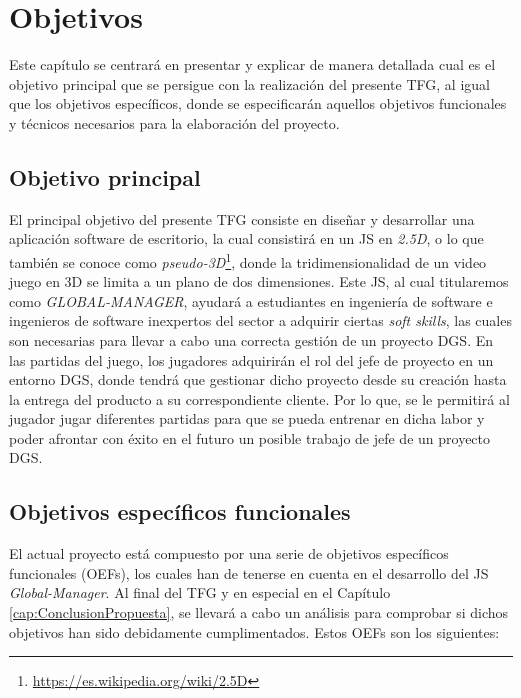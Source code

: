 \chapter{Objetivos}
\label{cap:Objetivo}

Este capítulo se centrará en presentar y explicar de manera detallada cual es el objetivo principal que se persigue con la realización del presente TFG, al igual que los objetivos específicos, donde se especificarán aquellos objetivos funcionales y técnicos necesarios para la elaboración del proyecto.

\section{Objetivo principal}
\label{sec:ObjetivoP}

El principal objetivo del presente TFG consiste en diseñar y desarrollar una aplicación software de escritorio, la cual consistirá en un JS en \emph{2.5D}, o lo que también se conoce como \emph{pseudo-3D}\footnote{\url{https://es.wikipedia.org/wiki/2.5D}}, donde la tridimensionalidad de un video juego en 3D se limita a un plano de dos dimensiones. Este JS, al cual titularemos como \emph{GLOBAL-MANAGER}, ayudará a estudiantes en ingeniería de software e ingenieros de software inexpertos del sector a adquirir ciertas \emph{soft skills}, las cuales son necesarias para llevar a cabo una correcta gestión de un proyecto DGS. En las partidas del juego, los jugadores adquirirán el rol del jefe de proyecto en un entorno DGS, donde tendrá que gestionar dicho proyecto desde su creación hasta la entrega del producto a su correspondiente cliente. Por lo que, se le permitirá al jugador jugar diferentes partidas para que se pueda entrenar en dicha labor y poder afrontar con éxito en el futuro un posible trabajo de jefe de un proyecto DGS. 


\section{Objetivos específicos funcionales}
\label{sec:ObjetivosF}

El actual proyecto está compuesto por una serie de objetivos específicos funcionales (OEFs), los cuales han de tenerse en cuenta en el desarrollo del JS \emph{Global-Manager}. Al final del TFG y en especial en el Capítulo \ref{cap:ConclusionPropuesta}, se llevará a cabo un análisis para comprobar si dichos objetivos han sido debidamente cumplimentados. Estos OEFs son los siguientes:

